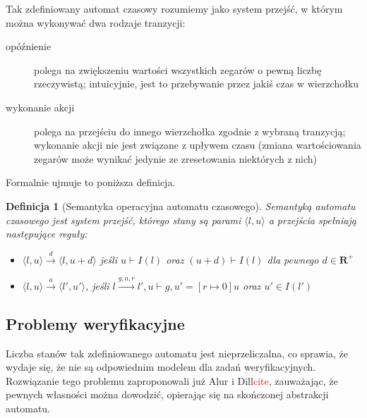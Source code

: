 \documentclass{pracamgr}
\newcommand{\todo}[1]{\textcolor{red}{#1}}
\newcommand{\pair}[2]{\langle #1, #2 \rangle}
\theoremstyle{plain}
\newtheorem{definition}{Definicja}
\begin{document}
Tak zdefiniowany automat czasowy rozumiemy jako
system przejść, w którym można wykonywać dwa rodzaje tranzycji:
\begin{description}
  \item[opóźnienie] polega na zwiększeniu wartości wszystkich zegarów
  o pewną liczbę rzeczywistą; intuicyjnie, jest to przebywanie przez
  jakiś czas w wierzchołku
  \item[wykonanie akcji] polega na przejściu do innego wierzchołka
  zgodnie z wybraną tranzycją; wykonanie akcji nie jest związane z
  upływem czasu (zmiana wartościowania zegarów może wynikać jedynie ze
  zresetowania niektórych z nich)
\end{description}
Formalnie ujmuje to poniższa definicja.
\begin{definition}[Semantyka operacyjna automatu czasowego] Semantyką
  automatu czasowego jest system przejść, którego stany są parami
$\langle l, u \rangle$ a przejścia spełniają następujące reguły:
  \begin{itemize}
    \item $\pair{l}{u} \stackrel{d}{\longrightarrow} \pair{l}{u+d}$
    jeśli $u \vdash I(l)$ oraz $(u+d) \vdash I(l)$ dla pewnego $d \in
    \mathbf{R}^{+}$
    \item $\pair{l}{u} \stackrel{a}{\longrightarrow} \pair{l'}{u'}$,
    jeśli $l \stackrel{g, a, r}{\longrightarrow} l', u \vdash g, u' =
    [r \mapsto 0]u$ oraz $u' \in I(l')$
  \end{itemize}
\end{definition}

\subsection{Problemy weryfikacyjne}

Liczba stanów tak zdefiniowanego automatu jest nieprzeliczalna, co
sprawia, że wydaje się, że nie są odpowiednim modelem dla zadań
weryfikacyjnych. Rozwiązanie tego problemu zaproponowali już Alur i
Dill\todo{cite}, zauważając, że pewnych własności można dowodzić,
opierając się na skończonej abstrakcji automatu.
\end{document}
